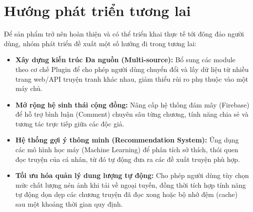 \section{Hướng phát triển tương lai}
Để sản phẩm trở nên hoàn thiện và có thể triển khai thực tế tới đông đảo người dùng, nhóm phát triển đề xuất một số hướng đi trong tương lai:
\begin{itemize}
    \item \textbf{Xây dựng kiến trúc Đa nguồn (Multi-source):} Bổ sung các module theo cơ chế Plugin để cho phép người dùng chuyển đổi và lấy dữ liệu từ nhiều trang web/API truyện tranh khác nhau, giảm thiểu rủi ro phụ thuộc vào một máy chủ.
    \item \textbf{Mở rộng hệ sinh thái cộng đồng:} Nâng cấp hệ thống đám mây (Firebase) để hỗ trợ bình luận (Comment) chuyên sâu từng chương, tính năng chia sẻ và tương tác trực tiếp giữa các độc giả.
    \item \textbf{Hệ thống gợi ý thông minh (Recommendation System):} Ứng dụng các mô hình học máy (Machine Learning) để phân tích sở thích, thói quen đọc truyện của cá nhân, từ đó tự động đưa ra các đề xuất truyện phù hợp.
    \item \textbf{Tối ưu hóa quản lý dung lượng tự động:} Cho phép người dùng tùy chọn mức chất lượng nén ảnh khi tải về ngoại tuyến, đồng thời tích hợp tính năng tự động dọn dẹp các chương truyện đã đọc xong hoặc bộ nhớ đệm (cache) sau một khoảng thời gian quy định.
\end{itemize}